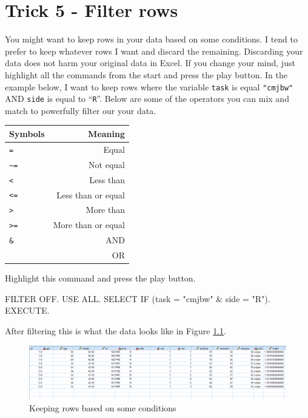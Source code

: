 \documentclass[
]{book}
\newenvironment{Shaded}{\begin{snugshade}}{\end{snugshade}}
\newcommand{\AttributeTok}[1]{\textcolor[rgb]{0.77,0.63,0.00}{#1}}
\newcommand{\FunctionTok}[1]{\textcolor[rgb]{0.00,0.00,0.00}{#1}}
\newcommand{\NormalTok}[1]{#1}
\newcommand{\SpecialCharTok}[1]{\textcolor[rgb]{0.00,0.00,0.00}{#1}}
\newcommand{\StringTok}[1]{\textcolor[rgb]{0.31,0.60,0.02}{#1}}
\begin{document}
\hypertarget{trick5}{%
\chapter{Trick 5 - Filter rows}\label{trick5}}

You might want to keep rows in your data based on some conditions. I tend to prefer to keep whatever rows I want and discard the remaining. Discarding your data does not harm your original data in Excel. If you change your mind, just highlight all the commands from the start and press the play button. In the example below, I want to keep rows where the variable \texttt{task} is equal \texttt{"cmjbw"} AND \texttt{side} is equal to ``\texttt{R}''. Below are some of the operators you can mix and match to powerfully filter our your data.

\begin{longtable}[]{@{}lr@{}}
\toprule
Symbols & Meaning \\
\midrule
\endhead
\texttt{=} & Equal \\
\texttt{\textasciitilde{}=} & Not equal \\
\texttt{\textless{}} & Less than \\
\texttt{\textless{}=} & Less than or equal \\
\texttt{\textgreater{}} & More than \\
\texttt{\textgreater{}=} & More than or equal \\
\texttt{\&} & AND \\
\texttt{\textbar{}} & OR \\
\bottomrule
\end{longtable}

Highlight this command and press the play button.

\begin{Shaded}
\begin{Highlighting}[]
\NormalTok{FILTER OFF.}
\NormalTok{USE ALL.}
\NormalTok{SELECT }\FunctionTok{IF}\NormalTok{ (}\AttributeTok{task =} \StringTok{"cmjbw"} \SpecialCharTok{\&}  \AttributeTok{side =} \StringTok{"R"}\NormalTok{).}
\NormalTok{EXECUTE.}
\end{Highlighting}
\end{Shaded}

After filtering this is what the data looks like in Figure \ref{fig:filter-row}.

\begin{figure}
\includegraphics[width=1\linewidth]{images/filter} \caption{Keeping rows based on some conditions}\label{fig:filter-row}
\end{figure}
\end{document}

